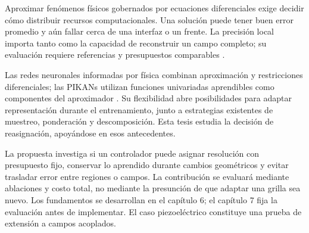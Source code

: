 \label{sec:introduccion}
Aproximar fenómenos físicos gobernados por ecuaciones diferenciales exige decidir cómo distribuir recursos computacionales. Una solución puede tener buen error promedio y aún fallar cerca de una interfaz o un frente. La precisión local importa tanto como la capacidad de reconstruir un campo completo; su evaluación requiere referencias y presupuestos comparables \cite{grossmann2024,krishnapriyan2021}.

Las redes neuronales informadas por física combinan aproximación y restricciones diferenciales; las PIKANs utilizan funciones univariadas aprendibles como componentes del aproximador \cite{raissi2019,liu2024kan}. Su flexibilidad abre posibilidades para adaptar representación durante el entrenamiento, junto a estrategias existentes de muestreo, ponderación y descomposición. Esta tesis estudia la decisión de reasignación, apoyándose en esos antecedentes.

La propuesta investiga si un controlador puede asignar resolución con presupuesto fijo, conservar lo aprendido durante cambios geométricos y evitar trasladar error entre regiones o campos. La contribución se evaluará mediante ablaciones y costo total, no mediante la presunción de que adaptar una grilla sea nuevo. Los fundamentos se desarrollan en el capítulo 6; el capítulo 7 fija la evaluación antes de implementar. El caso piezoeléctrico constituye una prueba de extensión a campos acoplados.
